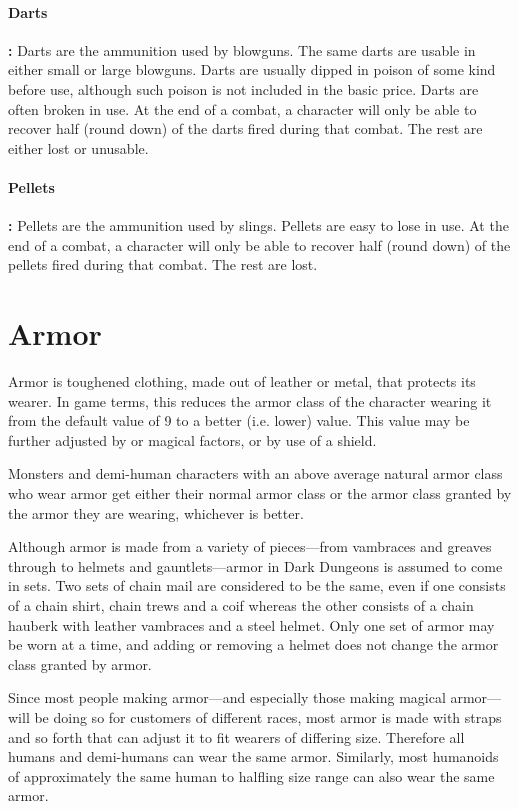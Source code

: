 \begin{multicols*}{2}
\paragraph{Darts}\textbf{:} Darts are the ammunition used by blowguns. The same darts are usable in either small or large blowguns. Darts are usually dipped in poison of some kind before use, although such poison is not included in the basic price. Darts are often broken in use. At the end of a combat, a character will only be able to recover half (round down) of the darts fired during that combat. The rest are either lost or unusable.

\paragraph{Pellets}\textbf{:} Pellets are the ammunition used by slings. Pellets are easy to lose in use. At the end of a combat, a character will only be able to recover half (round down) of the pellets fired during that combat. The rest are lost.

\section{Armor}
Armor is toughened clothing, made out of leather or metal, that protects its wearer. In game terms, this reduces the armor class of the character wearing it from the default value of 9 to a better (i.e. lower) value. This value may be further adjusted by  or magical factors, or by use of a shield.

Monsters and demi-human characters with an above average natural armor class who wear armor get either their normal armor class or the armor class granted by the armor they are wearing, whichever is better.

Although armor is made from a variety of pieces—from vambraces and greaves through to helmets and gauntlets—armor in Dark Dungeons is assumed to come in sets. Two sets of chain mail are considered to be the same, even if one consists of a chain shirt, chain trews and a coif whereas the other consists of a chain hauberk with leather vambraces and a steel helmet. Only one set of armor may be worn at a time, and adding or removing a helmet does not change the armor class granted by armor.

Since most people making armor—and especially those making magical armor—will be doing so for customers of different races, most armor is made with straps and so forth that can adjust it to fit wearers of differing size. Therefore all humans and demi-humans can wear the same armor. Similarly, most humanoids of approximately the same human to halfling size range can also wear the same armor.


\end{multicols*}
